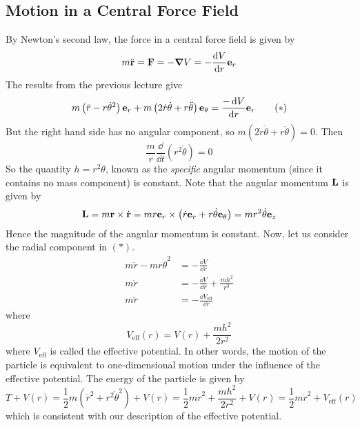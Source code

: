 \subsection{Motion in a Central Force Field}
By Newton's second law, the force in a central force field is given by
\[
	m\ddot{\vb r} = \vb F = -\grad V = -\frac{\dd{V}}{\dd{r}} \vb e_r
\]
The results from the previous lecture give
\begin{equation}
	m\left(\ddot r - r\dot\theta^2\right) \vb e_r + m\left(2\dot r \dot \theta + r \ddot \theta\right) \vb e_\theta = \frac{-\dd{V}}{\dd{r}} \vb e_r \tag{\(\ast\)}
\end{equation}
But the right hand side has no angular component, so \(m\left(2\dot r \dot \theta + r \ddot \theta\right) = 0\).
Then
\[
	\frac{m}{r} \frac{\dd}{\dd{t}}\left(r^2 \dot\theta\right) = 0
\]
So the quantity \(h = r^2 \dot\theta\), known as the \textit{specific} angular momentum (since it contains no mass component) is constant.
Note that the angular momentum \(\vb L\) is given by
\[
	\vb L = m\vb r \times \dot{\vb r} = mr\vb e_r \times \left( \dot r\vb e_r + r\dot\theta \vb e_\theta \right) = mr^2 \dot\theta \vb e_z
\]
Hence the magnitude of the angular momentum is constant.
Now, let us consider the radial component in \((\ast)\).
\begin{align*}
	m\ddot r - mr\dot\theta^2 & = -\frac{\dd{V}}{\dd{r}}                    \\
	m\ddot r                  & = -\frac{\dd{V}}{\dd{r}} + \frac{mh^2}{r^3} \\
	m\ddot r                  & = -\frac{\dd{V}_\text{eff}}{\dd{r}}
\end{align*}
where
\[
	V_\text{eff}(r) = V(r) + \frac{mh^2}{2r^2}
\]
where \(V_\text{eff}\) is called the effective potential.
In other words, the motion of the particle is equivalent to one-dimensional motion under the influence of the effective potential.
The energy of the particle is given by
\[
	T + V(r) = \frac{1}{2}m\left( \dot r^2 + r^2 \dot\theta^2 \right) + V(r) = \frac{1}{2}m\dot r^2 + \frac{mh^2}{2r^2} + V(r) = \frac{1}{2}m\dot r^2 + V_\text{eff}(r)
\]
which is consistent with our description of the effective potential.

